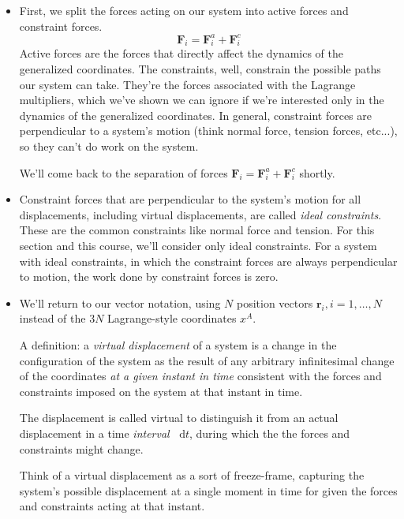 \documentclass[11pt, a4paper]{article}
\newcommand{\diff}{\mathop{}\!\mathrm{d}} %
\begin{document}
\begin{itemize}
	\item First, we split the forces acting on our system into active forces and constraint forces. 
	\begin{equation*}
		\bm{F}_{i} = \bm{F}_{i}^{a} + \bm{F}_{i}^{c}
	\end{equation*}
	Active forces are the forces that directly affect the dynamics of the generalized coordinates. The constraints, well, constrain the possible paths our system can take. They're the forces associated with the Lagrange multipliers, which we've shown we can ignore if we're interested only in the dynamics of the generalized coordinates. In general, constraint forces are perpendicular to a system's motion (think normal force, tension forces, etc...), so they can't do work on the system. 
	
	We'll come back to the separation of forces $ \bm{F}_{i} = \bm{F}_{i}^{a} + \bm{F}_{i}^{c} $ shortly.
		
	\item Constraint forces that are perpendicular to the system's motion for all displacements, including virtual displacements, are called \textit{ideal constraints}. These are the common constraints like normal force and tension. For this section and this course, we'll consider only ideal constraints. For a system with ideal constraints, in which the constraint forces are always perpendicular to motion, the work done by constraint forces is zero.
	
	\item We'll return to our vector notation, using $ N $ position vectors $ \bm{r}_{i}, i = 1, \ldots, N $ instead of the $ 3N $ Lagrange-style coordinates $ x^{A} $. 
	
	A definition: a \textit{virtual displacement} of a system is a change in the configuration of the system as the result of any arbitrary infinitesimal change of the coordinates \textit{at a given instant in time} consistent with the forces and constraints imposed on the system at that instant in time. 
	
	The displacement is called virtual to distinguish it from an actual displacement in a time \textit{interval} $ \diff t $, during which the the forces and constraints might change.
	
	Think of a virtual displacement as a sort of freeze-frame, capturing the system's possible displacement at a single moment in time for given the forces and constraints acting at that instant.
	

\end{itemize}
\end{document}
